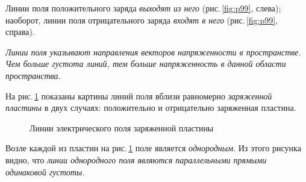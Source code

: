 \documentclass[main.tex]{subfiles}
\begin{document}
\begin{NoHyper}
Линии поля положительного заряда \emph{выходят из него} (рис.\,\ref{fig:p99}, слева); наоборот, линии поля отрицательного заряда \emph{входят в него} (рис.\,\ref{fig:p99}, справа).  

\emph{Линии поля указывают направления векторов напряженности в пространстве. Чем больше густота линий, тем больше напряженность в данной области пространства.}

На рис.\,\ref{fig:p100} показаны картины линий поля вблизи равномерно \emph{заряженной пластины} в двух случаях: положительно и отрицательно заряженная пластина.

    \begin{figure}[H]
    \centering

\caption{Линии электрического поля заряженной пластины}
\label{fig:p100}
\end{figure}

Возле каждой из пластин на рис.\,\ref{fig:p100} поле является \emph{однородным}. Из этого рисунка видно, что \emph{линии однородного поля являются параллельными прямыми одинаковой густоты.}  


\end{NoHyper}
\end{document}

